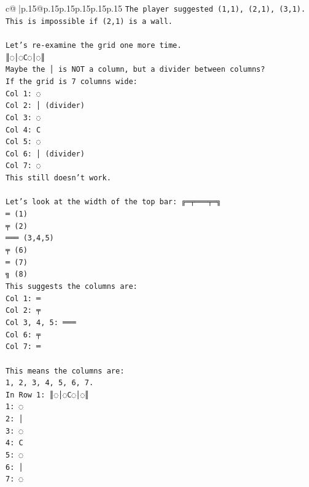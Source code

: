 \documentclass{article}
\begin{document}
{\begin{supertabular}{c@{$\;$}|p{.15\linewidth}@{}p{.15\linewidth}p{.15\linewidth}p{.15\linewidth}p{.15\linewidth}p{.15\linewidth}}
{{{\texttt{The player suggested (1,1), (2,1), (3,1). This is impossible if (2,1) is a wall.} \\
\\ 
\texttt{Let's re{-}examine the grid one more time.} \\
\texttt{║◌│◌C◌│◌║} \\
\texttt{Maybe the │ is NOT a column, but a divider between columns?} \\
\texttt{If the grid is 7 columns wide:} \\
\texttt{Col 1: ◌} \\
\texttt{Col 2: │ (divider)} \\
\texttt{Col 3: ◌} \\
\texttt{Col 4: C} \\
\texttt{Col 5: ◌} \\
\texttt{Col 6: │ (divider)} \\
\texttt{Col 7: ◌} \\
\texttt{This still doesn't work.} \\
\\ 
\texttt{Let's look at the width of the top bar: ╔═╤═══╤═╗} \\
\texttt{═ (1)} \\
\texttt{╤ (2)} \\
\texttt{═══ (3,4,5)} \\
\texttt{╤ (6)} \\
\texttt{═ (7)} \\
\texttt{╗ (8)} \\
\texttt{This suggests the columns are:} \\
\texttt{Col 1: ═} \\
\texttt{Col 2: ╤} \\
\texttt{Col 3, 4, 5: ═══} \\
\texttt{Col 6: ╤} \\
\texttt{Col 7: ═} \\
\\ 
\texttt{This means the columns are:} \\
\texttt{1, 2, 3, 4, 5, 6, 7.} \\
\texttt{In Row 1: ║◌│◌C◌│◌║} \\
\texttt{1: ◌} \\
\texttt{2: │} \\
\texttt{3: ◌} \\
\texttt{4: C} \\
\texttt{5: ◌} \\
\texttt{6: │} \\
\texttt{7: ◌} \\
}}}
\end{supertabular}}
\end{document}
